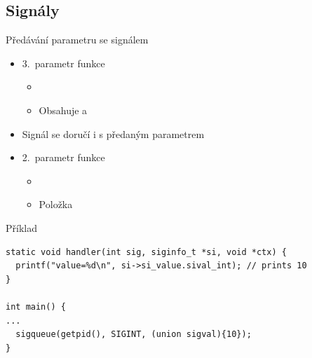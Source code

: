 \subsection*{Signály}
\frame{\subsectionpage}



\begin{frame}[fragile]{Předávání parametru se signálem}

  \begin{itemize}
    \item 3.\ parametr funkce 
    \begin{itemize}
      \item {}
      \item Obsahuje  a 
    \end{itemize}

    \pause

    \item Signál se doručí i s předaným parametrem

    \pause

    \item 2.\ parametr funkce 
    \begin{itemize}
      \item {}
      \item Položka 
    \end{itemize}

  \end{itemize}

  \begin{block}{Příklad}
    \begin{lstlisting}[aboveskip=2pt,belowskip=2pt,columns=fullflexible]
static void handler(int sig, siginfo_t *si, void *ctx) {
  printf("value=%d\n", si->si_value.sival_int); // prints 10
}

int main() {
...
  sigqueue(getpid(), SIGINT, (union sigval){10});
}
    \end{lstlisting}
  \end{block}

\end{frame}

